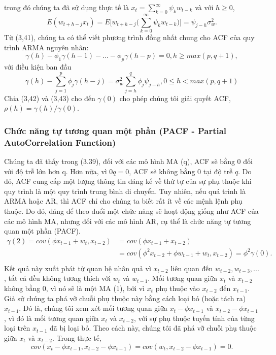 \documentclass[12pt, a4paper,oneside]{book}
\theoremstyle{definition}
\begin{document}
trong đó chúng ta đã sử dụng thực tế là $x_{t}=\sum_{k=0}^{\infty}\psi_{k}w_{t-k}$ và với $h \geq 0$,
$$E(w_{t+h-j}x_{t})= E\Bigg[w_{t+h-j}\Big(\displaystyle\sum_{k=0}^{\infty}\psi_{k}w_{t-k}\Big)\Bigg] = \psi_{j-h}\sigma_w^{2}.$$
Từ (3,41), chúng ta có thể viết phương trình đồng nhất chung cho ACF của quy trình ARMA nguyên nhân:
$$\gamma(h)-\phi_{1}\gamma(h-1)-...-\phi_{p}\gamma(h-p) = 0, h \geq max(p,q +1),$$
với điều kiện ban đầu
$$\gamma(h)-\displaystyle\sum_{j=1}^{p}\phi_{j}\gamma(h-j) = \sigma_w^{2}\displaystyle\sum_{j=h}^{q}\phi_{j}\psi_{j-h}, 0 \leq h < max(p,q+1)$$
Chia (3,42) và (3,43) cho đến $\gamma(0)$ cho phép chúng tôi giải quyết ACF, $\rho(h) = \gamma(h)/\gamma(0)$.
\subsubsection*{Chức năng tự tương quan một phần (PACF - Partial AutoCorrelation Function)}
Chúng ta đã thấy trong (3.39), đối với các mô hình MA (q), ACF sẽ bằng 0 đối với độ trễ lớn hơn q. Hơn nữa, vì $0q=0$, ACF sẽ không bằng $0$ tại độ trễ $q$. Do đó, ACF cung cấp một lượng thông tin đáng kể về thứ tự của sự phụ thuộc khi quy trình là một quy trình trung bình di chuyển. Tuy nhiên, nếu quá trình là ARMA hoặc AR, thì ACF chỉ cho chúng ta biết rất ít về các mệnh lệnh phụ thuộc. Do đó, đáng để theo đuổi một chức năng sẽ hoạt động giống như ACF của các mô hình MA, nhưng đối với các mô hình AR, cụ thể là chức năng tự tương quan một phần (PACF).
\begin{align*}
 \gamma(2) = cov(\phi x_{t-1} + w_{t}, x_{t-2}) & = cov(\phi x_{t-1}+x_{t-2})\\
 & = cov(\phi^{2}x_{t-2}+\phi w_{t-1}+w_{t},x_{t-2})= \phi^{2}\gamma(0).\\
\end{align*}
Kết quả này xuất phát từ quan hệ nhân quả vì $x_{t-2}$ liên quan đến ${w_{t-2},w_{t-3},... }$, tất cả đều không tương thích với $w_{t}$ và $w_{t-1}$. Mối tương quan giữa $x_{t}$ và $x_{t-2}$ không bằng 0, vì nó sẽ là một MA (1), bởi vì $x_{t}$ phụ thuộc vào $x_{t-2}$ đến $x_{t-1}$. Giả sử chúng ta phá vỡ chuỗi phụ thuộc này bằng cách loại bỏ (hoặc tách ra) $x_{t-1}$. Đó là, chúng tôi xem xét mối tương quan giữa $x_{t}-\phi x_{t-1}$ và $x_{t-2}-\phi x_{t-1}$, vì đó là mối tương quan giữa $x_{t}$ và $x_{t-2}$, với sự phụ thuộc tuyến tính của từng loại trên $x_{t-1}$ đã bị loại bỏ. Theo cách này, chúng tôi đã phá vỡ chuỗi phụ thuộc giữa $x_{t}$ và $x_{t-2}$. Trong thực tế, 
$$cov(x_{t}-\phi x_{t-1},x_{t-2}-\phi x_{t-1}) = cov(w_{t},x_{t-2}-\phi x_{t-1}) = 0.$$
\end{document}

